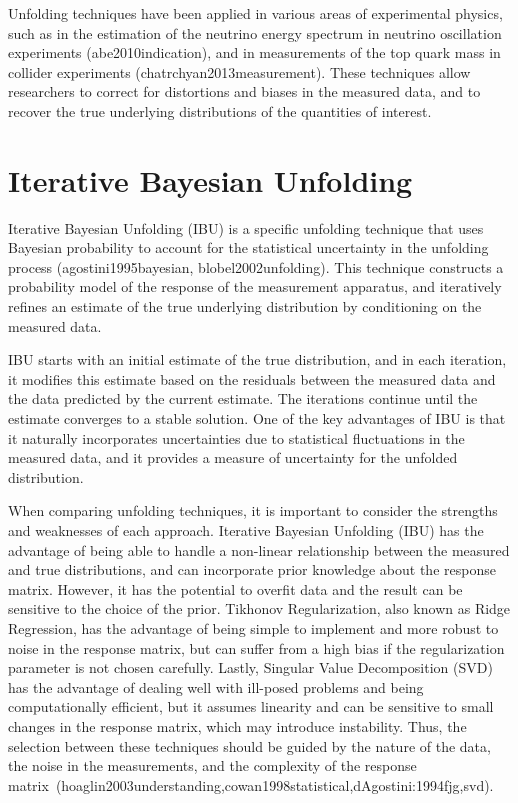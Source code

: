     Unfolding techniques have been applied in various areas of experimental physics, such as in the estimation of the neutrino energy spectrum in neutrino oscillation experiments (abe2010indication), and in measurements of the top quark mass in collider experiments (chatrchyan2013measurement). These techniques allow researchers to correct for distortions and biases in the measured data, and to recover the true underlying distributions of the quantities of interest.
    

\section{Iterative Bayesian Unfolding}
    
    Iterative Bayesian Unfolding (IBU) is a specific unfolding technique that uses Bayesian probability to account for the statistical uncertainty in the unfolding process (agostini1995bayesian, blobel2002unfolding). This technique constructs a probability model of the response of the measurement apparatus, and iteratively refines an estimate of the true underlying distribution by conditioning on the measured data.
    
    IBU starts with an initial estimate of the true distribution, and in each iteration, it modifies this estimate based on the residuals between the measured data and the data predicted by the current estimate. The iterations continue until the estimate converges to a stable solution. One of the key advantages of IBU is that it naturally incorporates uncertainties due to statistical fluctuations in the measured data, and it provides a measure of uncertainty for the unfolded distribution.
    
    When comparing unfolding techniques, it is important to consider the strengths and weaknesses of each approach. Iterative Bayesian Unfolding (IBU) has the advantage of being able to handle a non-linear relationship between the measured and true distributions, and can incorporate prior knowledge about the response matrix. However, it has the potential to overfit data and the result can be sensitive to the choice of the prior. Tikhonov Regularization, also known as Ridge Regression, has the advantage of being simple to implement and more robust to noise in the response matrix, but can suffer from a high bias if the regularization parameter is not chosen carefully. Lastly, Singular Value Decomposition (SVD) has the advantage of dealing well with ill-posed problems and being computationally efficient, but it assumes linearity and can be sensitive to small changes in the response matrix, which may introduce instability. Thus, the selection between these techniques should be guided by the nature of the data, the noise in the measurements, and the complexity of the response matrix~(hoaglin2003understanding,cowan1998statistical,dAgostini:1994fjg,svd).
    
